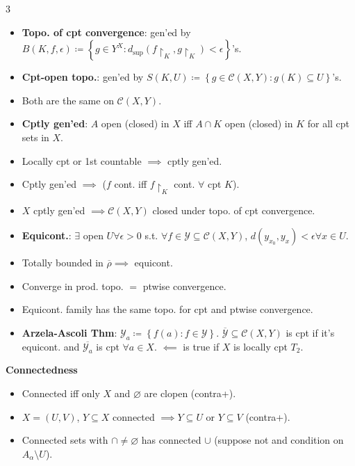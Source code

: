 \documentclass[10pt]{article}
\begin{document}
\begin{multicols*}{3}
\begin{itemize}
            \item \textbf{Topo. of cpt convergence}: gen'ed by $B\left(K, f, \epsilon\right) \coloneqq \left\{g \in Y^X \colon d_{\sup}\left(f\restriction_K, g\restriction_K\right) < \epsilon\right\}$'s.
            \item \textbf{Cpt-open topo.}: gen'ed by $S\left(K, U\right) \coloneqq \left\{g \in \mathcal{C}\left(X, Y\right) \colon g\left(K\right) \subseteq U\right\}$'s.
            \item Both are the same on $\mathcal{C}\left(X, Y\right)$.
            \item \textbf{Cptly gen'ed}: $A$ open (closed) in $X$ iff $A \cap K$ open (closed) in $K$ for all cpt sets in $X$.
            \item Locally cpt or 1st countable $\implies$ cptly gen'ed.
            \item Cptly gen'ed $\implies$ ($f$ cont. iff $f\restriction_K$ cont. $\forall$ cpt $K$).
            \item $X$ cptly gen'ed $\implies \mathcal{C}\left(X, Y\right)$ closed under topo. of cpt convergence.
            \item \textbf{Equicont.}: $\exists$ open $U \forall \epsilon > 0$ s.t. $\forall f \in \mathcal{Y} \subseteq \mathcal{C}\left(X, Y\right)$, $d\left(y_{x_0}, y_x\right) < \epsilon \forall x \in U$.
            \item Totally bounded in $\overline{\rho} \implies$ equicont.
            \item Converge in prod. topo. $=$ ptwise convergence.
            \item Equicont. family has the same topo. for cpt and ptwise convergence.
            \item \textbf{Arzela-Ascoli Thm}: $\mathcal{Y}_a \coloneqq \left\{f\left(a\right) \colon f \in \mathcal{Y}\right\}$. $\overline{\mathcal{Y}} \subseteq \mathcal{C}\left(X, Y\right)$ is cpt if it's equicont. and $\overline{\mathcal{Y}_a}$ is cpt $\forall a \in X$. $\impliedby$ is true if $X$ is locally cpt $T_2$. 
        \end{itemize}
        \textbf{Connectedness}
        \begin{itemize}
            \setlength\itemsep{0.11em}
            \item Connected iff only $X$ and $\varnothing$ are clopen (contra+).
            \item $X = \left(U, V\right)$, $Y \subseteq X$ connected $\implies Y \subseteq U$ or $Y \subseteq V$ (contra+).
            \item Connected sets with $\cap \neq \varnothing$ has connected $\cup$ (suppose not and condition on $A_{\alpha} \setminus U$).

\end{itemize}
\end{multicols*}
\end{document}

